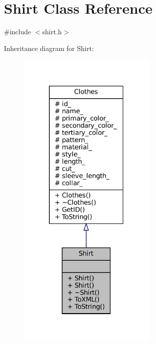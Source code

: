 \hypertarget{classShirt}{}\section{Shirt Class Reference}
\label{classShirt}


{\ttfamily \#include $<$shirt.\+h$>$}



Inheritance diagram for Shirt\+:\nopagebreak
\begin{figure}[H]
\begin{center}
\leavevmode
\includegraphics[width=193pt]{classShirt__inherit__graph}
\end{center}
\end{figure}


